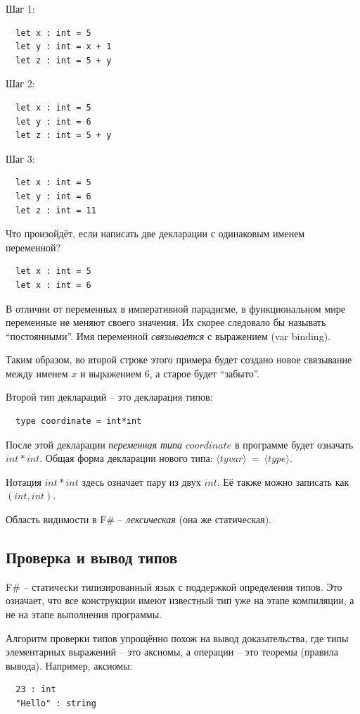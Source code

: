 \documentclass[a4paper,11pt]{article}
\begin{document}
Шаг 1:
\begin{lstlisting}
  let x : int = 5
  let y : int = x + 1
  let z : int = 5 + y
\end{lstlisting}

Шаг 2:
\begin{lstlisting}
  let x : int = 5
  let y : int = 6
  let z : int = 5 + y
\end{lstlisting}

Шаг 3:
\begin{lstlisting}
  let x : int = 5
  let y : int = 6
  let z : int = 11
\end{lstlisting}

Что произойдёт, если написать две декларации с одинаковым именем переменной?
\begin{lstlisting}
  let x : int = 5
  let x : int = 6
\end{lstlisting}

В отличии от переменных в императивной парадигме, в функциональном мире
переменные не меняют своего значения. Их скорее следовало бы называть
``постоянными''. Имя переменной \emph{связывается} с выражением (var binding).

Таким образом, во второй строке этого примера будет создано новое 
связывание между именем $x$ и выражением $6$, а старое будет ``забыто''.

Второй тип деклараций -- это декларация типов:
\begin{lstlisting}
  type coordinate = int*int
\end{lstlisting}

После этой декларации \emph{переменная типа} $coordinate$ в программе будет
означать $int * int$. Общая форма декларации нового типа: $\langle tyvar
\rangle~=~\langle type \rangle$.

Нотация $int * int$ здесь означает пару из двух $int$. Её также можно записать
как $(int, int)$.

Область видимости в F\# -- \emph{лексическая} (она же статическая). 

\subsection{Проверка и вывод типов}

F\# -- статически типизированный язык с поддержкой определения типов. Это 
означает, что все конструкции имеют известный тип уже на этапе компиляции, а не
на этапе выполнения программы.

Алгоритм проверки типов упрощённо похож на вывод доказательства, где типы
элементарных выражений -- это аксиомы, а операции -- это теоремы (правила 
вывода). Например, аксиомы:
\begin{lstlisting}
  23 : int
  "Hello" : string
\end{lstlisting}
\end{document}
